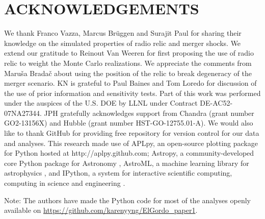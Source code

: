 \documentclass[letterpaper,useAMS,usenatbib]{mn2e}
\begin{document}
\section{ACKNOWLEDGEMENTS}
We thank Franco Vazza, Marcus Br\"{u}ggen and Surajit Paul for sharing
their knowledge on the simulated properties of radio relic and merger
shocks. We extend our gratitude to Reinout Van Weeren for first proposing the use of
radio relic to weight the Monte Carlo realizations. We appreciate the
comments from Maru\v{s}a Brada\v{c} about using the position of the relic to
break degeneracy of the merger scenario. KN is grateful to Paul Baines and
Tom Loredo for discussion of the use of prior information and sensitivity tests. 
Part of this work was performed under the auspices of the U.S. DOE by LLNL
under Contract DE-AC52-07NA27344. 
JPH gratefully acknowledges support from Chandra (grant number GO2-13156X)
and Hubble (grant number HST-GO-12755.01-A).
We would also like to thank 
GitHub for providing free repository for version control for our data and
analyses. This research made use of APLpy, an open-source plotting package for Python
hosted at http://aplpy.github.com; Astropy, a community-developed core
Python package for Astronomy \citep{astropy}, AstroML, a
machine learning library for astrophysics \citep{VanderPlas2012}, and IPython, a system for
interactive scientific computing, computing in science and engineering
\citep{Perez2007}.\par
Note: The authors have made the Python code for most of the analyses openly
available on \href{https://github.com/karenyyng/ElGordo_paper1}{https://github.com/karenyyng/ElGordo_paper1}. 



\appendix
\end{document}
